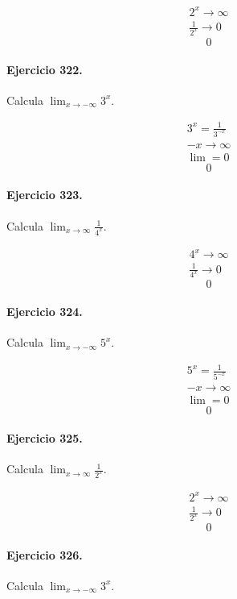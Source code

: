 \documentclass[11pt,a4paper]{article}
\begin{document}
\[
\begin{aligned}
2^x\to\infty\\
\frac{1}{2^x}\to0
\end{aligned}
\]
\[\boxed{0}\]


\paragraph{Ejercicio 322.} Calcula $\displaystyle\lim_{x\to-\infty}3^x$.

\[
\begin{aligned}
3^x=\frac{1}{3^{-x}}\\
-x\to\infty\\
\lim=0
\end{aligned}
\]
\[\boxed{0}\]


\paragraph{Ejercicio 323.} Calcula $\displaystyle\lim_{x\to\infty}\frac{1}{4^x}$.

\[
\begin{aligned}
4^x\to\infty\\
\frac{1}{4^x}\to0
\end{aligned}
\]
\[\boxed{0}\]


\paragraph{Ejercicio 324.} Calcula $\displaystyle\lim_{x\to-\infty}5^x$.

\[
\begin{aligned}
5^x=\frac{1}{5^{-x}}\\
-x\to\infty\\
\lim=0
\end{aligned}
\]
\[\boxed{0}\]


\paragraph{Ejercicio 325.} Calcula $\displaystyle\lim_{x\to\infty}\frac{1}{2^x}$.

\[
\begin{aligned}
2^x\to\infty\\
\frac{1}{2^x}\to0
\end{aligned}
\]
\[\boxed{0}\]


\paragraph{Ejercicio 326.} Calcula $\displaystyle\lim_{x\to-\infty}3^x$.
\end{document}

